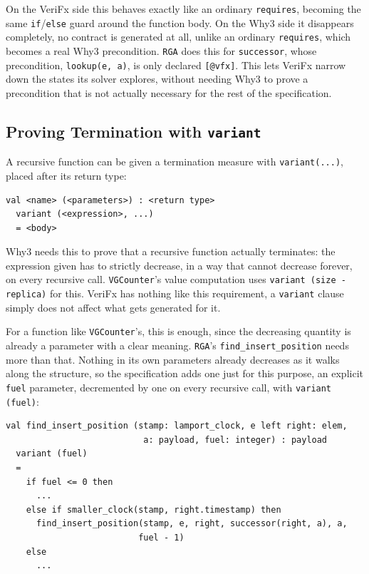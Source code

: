 On the VeriFx side this behaves exactly like an ordinary \texttt{requires}, becoming the same \texttt{if}/\texttt{else}
guard around the function body. On the Why3 side it disappears completely, no contract is generated at all, unlike an
ordinary \texttt{requires}, which becomes a real Why3 precondition. \texttt{RGA} does this for \texttt{successor}, whose
precondition, \texttt{lookup(e, a)}, is only declared \texttt{[@vfx]}. This lets VeriFx narrow down the states its solver
explores, without needing Why3 to prove a precondition that is not actually necessary for the rest of the specification.

\subsection{Proving Termination with \texttt{variant}}
\label{sub:variant}

A recursive function can be given a termination measure with \texttt{variant(...)}, placed after its return type:

\begin{verbatim}
val <name> (<parameters>) : <return type>
  variant (<expression>, ...)
  = <body>
\end{verbatim}

Why3 needs this to prove that a recursive function actually terminates: the expression given has to strictly decrease,
in a way that cannot decrease forever, on every recursive call. \texttt{VGCounter}'s value computation uses
\texttt{variant (size - replica)} for this. VeriFx has nothing like this requirement, a \texttt{variant} clause simply
does not affect what gets generated for it.

For a function like \texttt{VGCounter}'s, this is enough, since the decreasing quantity is already a parameter with a
clear meaning. \texttt{RGA}'s \texttt{find\_insert\_position} needs more than that. Nothing in its own parameters already
decreases as it walks along the structure, so the specification adds one just for this purpose, an explicit \texttt{fuel}
parameter, decremented by one on every recursive call, with \texttt{variant (fuel)}:

\begin{verbatim}
val find_insert_position (stamp: lamport_clock, e left right: elem,
                           a: payload, fuel: integer) : payload
  variant (fuel)
  =
    if fuel <= 0 then
      ...
    else if smaller_clock(stamp, right.timestamp) then
      find_insert_position(stamp, e, right, successor(right, a), a,
                          fuel - 1)
    else
      ...
\end{verbatim}

